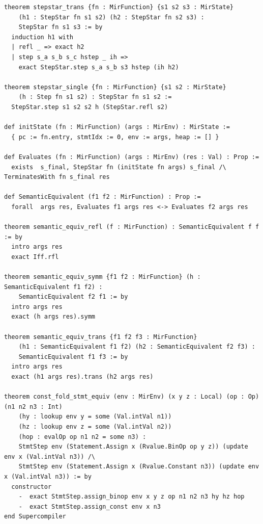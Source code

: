 \begin{lstlisting}[language=Lean4, caption={Complete Formal Operational Semantics Mechanization in Lean 4 (\texttt{lean/Supercompiler/Semantics.lean}).}, label={lst:semantics_lean_verbatim}]
theorem stepstar_trans {fn : MirFunction} {s1 s2 s3 : MirState}
    (h1 : StepStar fn s1 s2) (h2 : StepStar fn s2 s3) :
    StepStar fn s1 s3 := by
  induction h1 with
  | refl _ => exact h2
  | step s_a s_b s_c hstep _ ih =>
    exact StepStar.step s_a s_b s3 hstep (ih h2)

theorem stepstar_single {fn : MirFunction} {s1 s2 : MirState}
    (h : Step fn s1 s2) : StepStar fn s1 s2 :=
  StepStar.step s1 s2 s2 h (StepStar.refl s2)

def initState (fn : MirFunction) (args : MirEnv) : MirState :=
  { pc := fn.entry, stmtIdx := 0, env := args, heap := [] }

def Evaluates (fn : MirFunction) (args : MirEnv) (res : Val) : Prop :=
  exists  s_final, StepStar fn (initState fn args) s_final /\ TerminatesWith fn s_final res

def SemanticEquivalent (f1 f2 : MirFunction) : Prop :=
  forall  args res, Evaluates f1 args res <-> Evaluates f2 args res

theorem semantic_equiv_refl (f : MirFunction) : SemanticEquivalent f f := by
  intro args res
  exact Iff.rfl

theorem semantic_equiv_symm {f1 f2 : MirFunction} (h : SemanticEquivalent f1 f2) :
    SemanticEquivalent f2 f1 := by
  intro args res
  exact (h args res).symm

theorem semantic_equiv_trans {f1 f2 f3 : MirFunction}
    (h1 : SemanticEquivalent f1 f2) (h2 : SemanticEquivalent f2 f3) :
    SemanticEquivalent f1 f3 := by
  intro args res
  exact (h1 args res).trans (h2 args res)

theorem const_fold_stmt_equiv (env : MirEnv) (x y z : Local) (op : Op) (n1 n2 n3 : Int)
    (hy : lookup env y = some (Val.intVal n1))
    (hz : lookup env z = some (Val.intVal n2))
    (hop : evalOp op n1 n2 = some n3) :
    StmtStep env (Statement.Assign x (Rvalue.BinOp op y z)) (update env x (Val.intVal n3)) /\
    StmtStep env (Statement.Assign x (Rvalue.Constant n3)) (update env x (Val.intVal n3)) := by
  constructor
    -  exact StmtStep.assign_binop env x y z op n1 n2 n3 hy hz hop
    -  exact StmtStep.assign_const env x n3
end Supercompiler

\end{lstlisting}
